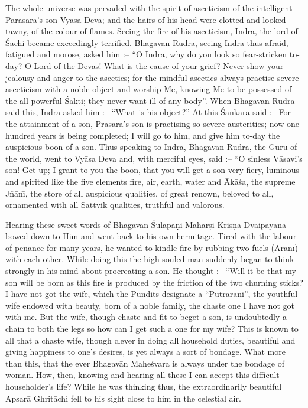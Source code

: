 The whole universe was pervaded with the spirit of asceticism of the intelligent Par\=asara's son Vy\=asa Deva; and the hairs of his head were clotted and looked tawny, of the colour of flames. Seeing the fire of his asceticism, Indra, the lord of \'Sachi became exceedingly terrified. Bhagav\=an Rudra, seeing Indra thus afraid, fatigued and morose, asked him :-- ``O Indra, why do you look so fear-stricken to-day? O Lord of the Devas! What is the cause of your grief? Never show your jealousy and anger to the ascetics; for the mindful ascetics always practise severe asceticism with a noble object and worship Me, knowing Me to be possessed of the all powerful \'Sakti; they never want ill of any body''. When Bhagav\=an Rudra said this, Indra asked him :-- ``What is his object?'' At this \'Sankara said :-- For the attainment of a son, Pras\=ara's son is practising so severe austerities; now one-hundred years is being completed; I will go to him, and give him to-day the auspicious boon of a son. Thus speaking to Indra, Bhagav\=an Rudra, the Guru of the world, went to Vy\=asa Deva and, with merciful eyes, said :-- ``O sinless V\=asavi's son! Get up; I grant to you the boon, that you will get a son very fiery, luminous and spirited like the five elements fire, air, earth, water and \=Ak\=a\'sa, the supreme J\~n\=an\={\i}, the store of all auspicious qualities, of great renown, beloved to all, ornamented with all Sattvik qualities, truthful and valorous.

Hearing these sweet words of Bhagav\=an \'S\=ulap\=a\d{n}i Mahar\d{s}i Kri\d{s}\d{n}a Dvaip\=ayana bowed down to Him and went back to his own hermitage. Tired with the labour of penance for many years, he wanted to kindle fire by rubbing two fuels (Aran\={\i}) with each other. While doing this the high souled man suddenly began to think strongly in his mind about procreating a son. He thought :-- ``Will it be that my son will be born as this fire is produced by the friction of the two churning sticks? I have not got the wife, which the Pundits designate a ``Putr\=arani'', the youthful wife endowed with beauty, born of a noble family, the chaste one I have not got with me. But the wife, though chaste and fit to beget a son, is undoubtedly a chain to both the legs so how can I get such a one for my wife? This is known to all that a chaste wife, though clever in doing all household duties, beautiful and giving happiness to one's desires, is yet always a sort of bondage. What more than this, that the ever Bhagav\=an Mahe\'svara is always under the bondage of woman. How, then, knowing and hearing all these I can accept this difficult householder's life? While he was thinking thus, the extraordinarily beautiful Apsar\=a Ghrit\=achi fell to his sight close to him in the celestial air.

